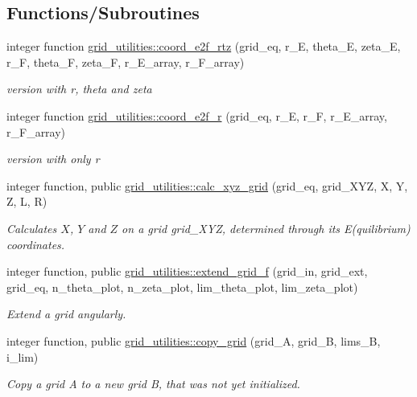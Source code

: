 \subsection*{Functions/\+Subroutines}
\begin{DoxyCompactItemize}
\item 
integer function \hyperlink{namespacegrid__utilities_a2a3c0509679b438d9d5aa5bedfb7a7b8}{grid\+\_\+utilities\+::coord\+\_\+e2f\+\_\+rtz} (grid\+\_\+eq, r\+\_\+E, theta\+\_\+E, zeta\+\_\+E, r\+\_\+F, theta\+\_\+F, zeta\+\_\+F, r\+\_\+\+E\+\_\+array, r\+\_\+\+F\+\_\+array)
\begin{DoxyCompactList}\small\item\em version with r, theta and zeta \end{DoxyCompactList}\item 
integer function \hyperlink{namespacegrid__utilities_a7866b2c198255dec7904dac73ccf4340}{grid\+\_\+utilities\+::coord\+\_\+e2f\+\_\+r} (grid\+\_\+eq, r\+\_\+E, r\+\_\+F, r\+\_\+\+E\+\_\+array, r\+\_\+\+F\+\_\+array)
\begin{DoxyCompactList}\small\item\em version with only r \end{DoxyCompactList}\item 
integer function, public \hyperlink{namespacegrid__utilities_a39e7cd9b8f173994358dbdd6b57827e1}{grid\+\_\+utilities\+::calc\+\_\+xyz\+\_\+grid} (grid\+\_\+eq, grid\+\_\+\+X\+YZ, X, Y, Z, L, R)
\begin{DoxyCompactList}\small\item\em Calculates $X$, $Y$ and $Z$ on a grid {\ttfamily grid\+\_\+\+X\+YZ}, determined through its E(quilibrium) coordinates. \end{DoxyCompactList}\item 
integer function, public \hyperlink{namespacegrid__utilities_a414a1a11924bc935afca3a89fc31f2f5}{grid\+\_\+utilities\+::extend\+\_\+grid\+\_\+f} (grid\+\_\+in, grid\+\_\+ext, grid\+\_\+eq, n\+\_\+theta\+\_\+plot, n\+\_\+zeta\+\_\+plot, lim\+\_\+theta\+\_\+plot, lim\+\_\+zeta\+\_\+plot)
\begin{DoxyCompactList}\small\item\em Extend a grid angularly. \end{DoxyCompactList}\item 
integer function, public \hyperlink{namespacegrid__utilities_a04f971c38083f873a04eb6568bed466b}{grid\+\_\+utilities\+::copy\+\_\+grid} (grid\+\_\+A, grid\+\_\+B, lims\+\_\+B, i\+\_\+lim)
\begin{DoxyCompactList}\small\item\em Copy a grid A to a new grid B, that was not yet initialized. \end{DoxyCompactList}\item 

\end{DoxyCompactItemize}
